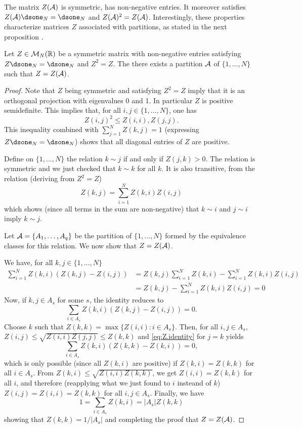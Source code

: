 The matrix $Z({\mathcal A})$ is symmetric, has non-negative entries. It moreover satisfies $Z(\CA) \dsone_N = \dsone_N$ and $Z({\mathcal A})^2 = Z({\mathcal A})$. 
Interestingly, these properties characterize matrices $Z$ associated with partitions, as stated in the next proposition \citep{peng2005new,peng2007approximating}.
\begin{proposition}
\label{prop:mat.partition}
Let $Z\in {\mathcal M}_N({\mathbb{R}})$ be a symmetric matrix with non-negative entries satisfying $Z\dsone_N = \dsone_N$ and $Z^2 = Z$. The there exists a partition ${\mathcal A}$ of $\{1, \ldots, N\}$ such that $Z = Z({\mathcal A})$.
\end{proposition}
\begin{proof}
Note that $Z$ being symmetric and satisfying $Z^2 = Z$ imply that it is an orthogonal projection with eigenvalues 0 and 1. In particular $Z$ is positive semidefinite. This implies that, for all $i,j\in \{1, \ldots, N\}$, one has
\[
Z(i,j)^2 \leq Z(i,i), Z(j,j).
\]
This inequality combined with $\sum_{j=1}^N Z(k, j) = 1$ (expressing $Z\dsone_N = \dsone_N$) shows that all diagonal entries of $Z$ are positive.

Define on $\{1,\ldots, N\}$ the relation $k\sim j$ if and only if $Z(j,k) >0$. The relation is symmetric and we just checked that $k\sim k$ for all $k$. It is also transitive, from the relation (deriving from $Z^2=Z$)
\[
Z(k,j) = \sum_{i=1}^N Z(k,i) Z(i,j)
\]
which shows (since all terms in the sum are non-negative) that $k\sim i$ and $j\sim i$ imply $k\sim j$.

Let ${\mathcal A} = \{A_1, \ldots, A_q\}$ be the partition of $\{1, \ldots, N\}$ formed by the equivalence classes for this relation. We now show that $Z = Z({\mathcal A})$.


We have, for all $k,j\in \{1, \ldots, N\}$
\begin{align*}
\sum_{i=1}^N Z(k, i) (Z(k, j) - Z(i, j)) & =Z(k,j)  \sum_{i=1}^N Z(k, i) - \sum_{i=1}^N Z(k, i) Z(i, j)\\
\nonumber
&= Z(k,j) - \sum_{i=1}^N Z(k, i) Z(i, j) = 0
\end{align*}
Now, if $k,j \in A_s$ for some $s$, the identity reduces to
\begin{equation}
\label{eq:Z.identity}
\sum_{i\in A_s} Z(k, i) (Z(k, j) - Z(i, j)) = 0.
\end{equation}
Choose $k$ such that $Z(k,k) = \max\{Z(i,i): i \in A_s\}$. Then, for all $i,j\in A_s$,
$Z(i,j) \leq \sqrt{Z(i,i)Z(j,j)} \leq Z(k,k)$ and \cref{eq:Z.identity} for $j=k$ yields
\[
\sum_{i\in A_s} Z(k, i) (Z(k, k) - Z(k,i)) = 0,
\]
which is only possible (since all $Z(k,i)$ are positive) if $Z(k,i) = Z(k,k)$ for all $i\in A_s$. From $Z(k,i) \leq \sqrt{Z(i,i)Z(k,k)}$, we get $Z(i,i) = Z(k,k)$ for all $i$, and therefore (reapplying what we just found to $i$ insteand of $k$) $Z(i,j) = Z(i,i) = Z(k,k)$ for all $i,j\in A_s$. Finally, we have
\[
1 = \sum_{i\in A_s} Z(k,i) = |A_s| Z(k,k)
\]
showing that $Z(k,k) = 1/|A_s|$ and completing the proof that $Z = Z({\mathcal A})$.
\end{proof}

